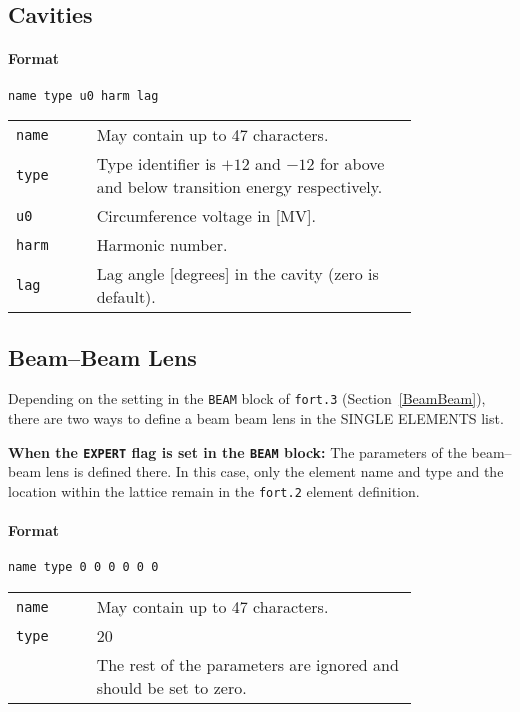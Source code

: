 \subsection{Cavities} \label{Cavities}

\paragraph{Format} \texttt{name type u0 harm lag}

\bigskip
\begin{tabular}{@{}lp{0.8\linewidth}}
    \texttt{name} & May contain up to 47 characters. \\
    \texttt{type} & Type identifier is $+12$ and $-12$ for above and below transition energy respectively. \\
    \texttt{u0}   & Circumference voltage in [MV]. \\
    \texttt{harm} & Harmonic number. \\
    \texttt{lag}  & Lag angle [degrees] in the cavity (zero is default).
\end{tabular}

\subsection{Beam--Beam Lens} \label{BBS}

Depending on the setting in the \texttt{BEAM} block of \texttt{fort.3} (Section~\ref{BeamBeam}), there are two ways to define a beam beam lens in the SINGLE ELEMENTS list.

\bigskip
\noindent\textbf{When the \texttt{EXPERT} flag is set in the \texttt{BEAM} block:}
The parameters of the beam--beam lens is defined there.
In this case, only the element name and type and the location within the lattice remain in the \texttt{fort.2} element definition.

\paragraph{Format} \texttt{name type 0 0 0 0 0 0}

\bigskip
\begin{tabular}{@{}lp{0.8\linewidth}}
    \texttt{name} & May contain up to 47 characters. \\
    \texttt{type} & 20 \\
    \texttt{}     & The rest of the parameters are ignored and should be set to zero.
\end{tabular}

